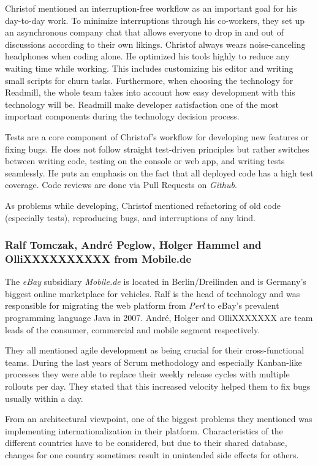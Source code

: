 Christof mentioned an interruption-free workflow as an important goal for his day-to-day work. To minimize interruptions through his co-workers, they set up an asynchronous company chat that allows everyone to drop in and out of discussions according to their own likings. Christof always wears noise-canceling headphones when coding alone. He optimized his tools highly to reduce any waiting time while working. This includes customizing his editor and writing small scripts for churn tasks. Furthermore, when choosing the technology for Readmill, the whole team takes into account how easy development with this technology will be. Readmill make developer satisfaction one of the most important components during the technology decision process.

Tests are a core component of Christof's workflow for developing new features or fixing bugs. He does not follow straight test-driven principles but rather switches between writing code, testing on the console or web app, and writing tests seamlessly. He puts an emphasis on the fact that all deployed code has a high test coverage. Code reviews are done via Pull Requests on \emph{Github}.

As problems while developing, Christof mentioned refactoring of old code (especially tests), reproducing bugs, and interruptions of any kind.

\subsubsection{Ralf Tomczak, Andr\'e Peglow, Holger Hammel and OlliXXXXXXXXXX from Mobile.de}
The \emph{eBay} subsidiary \emph{Mobile.de} is located in Berlin/Dreilinden and is Germany's biggest online marketplace for vehicles. Ralf is the head of technology and was responsible for migrating the web platform from \emph{Perl} to eBay's prevalent programming language Java in 2007. Andr\'e, Holger and OlliXXXXXXX  are team leads of the consumer, commercial and mobile segment respectively.

They all mentioned agile development as being crucial for their cross-functional teams. During the last years of Scrum methodology and especially Kanban-like processes they were able to replace their weekly release cycles with multiple rollouts per day. They stated that this increased velocity helped them to fix bugs usually within a day.

From an architectural viewpoint, one of the biggest problems they mentioned was implementing internationalization in their platform. Characteristics of the different countries have to be considered, but due to their shared database, changes for one country sometimes result in unintended side effects for others.

